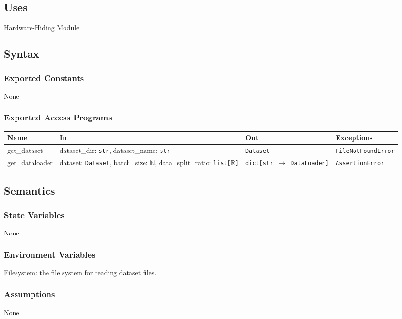 \documentclass[12pt, titlepage]{article}
\begin{document}
\subsection{Uses}
Hardware-Hiding Module

\subsection{Syntax}

\subsubsection{Exported Constants}
None

\subsubsection{Exported Access Programs}

\begin{center}
\begin{tabular}{p{3.2cm} p{5.5cm} p{4cm} p{2.5cm}}
\hline
\textbf{Name} & \textbf{In} & \textbf{Out} & \textbf{Exceptions} \\
\hline
get\_dataset & dataset\_dir: \texttt{str}, dataset\_name: \texttt{str} & \texttt{Dataset} & \texttt{FileNotFoundError} \\
get\_dataloader & dataset: \texttt{Dataset}, batch\_size: \(\mathbb{N}\), data\_split\_ratio: \texttt{list[\(\mathbb{R}\)]} & \texttt{dict[str \(\rightarrow\) DataLoader]} & \texttt{AssertionError} \\
\hline
\end{tabular}
\end{center}

\subsection{Semantics}

\subsubsection{State Variables}
None

\subsubsection{Environment Variables}
Filesystem: the file system for reading dataset files.

\subsubsection{Assumptions}
None
\end{document}
